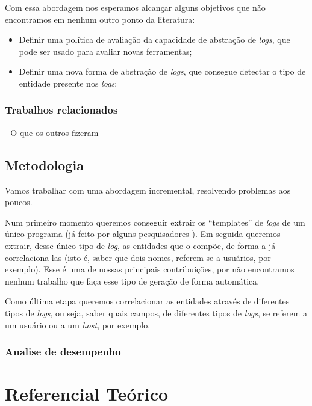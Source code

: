 \documentclass[
	12pt,				%
	openright,			%
	twoside,			%
	a4paper,			%
	english,			%
	french,				%
	spanish,			%
	brazil,				%
	]{abntex2}
\begin{document}
Com essa abordagem nos esperamos alcançar alguns objetivos que não encontramos em nenhum outro ponto da literatura:

\begin{itemize}
	\item Definir uma política de avaliação da capacidade de abstração de \emph{logs}, que pode ser usado para avaliar novas ferramentas;
	\item Definir uma nova forma de abstração de \emph{logs}, que consegue detectar o tipo de entidade presente nos \emph{logs};
\end{itemize}

\subsection{Trabalhos relacionados}
- O que os outros fizeram

\section{Metodologia}

Vamos trabalhar com uma abordagem incremental, resolvendo problemas aos poucos.

Num primeiro momento queremos conseguir extrair os ``templates'' de \emph{logs} de um único programa (já feito por alguns pesquisadores \cite{nagappan2010abstracting}). Em seguida queremos extrair, desse único tipo de \emph{log}, as entidades que o compõe, de forma a já correlaciona-las (isto é, saber que dois nomes, referem-se a usuários, por exemplo). Esse é uma de nossas principais contribuições, por não encontramos nenhum trabalho que faça esse tipo de geração de forma automática.

Como última etapa queremos correlacionar as entidades através de diferentes tipos de \emph{logs}, ou seja, saber quais campos, de diferentes tipos de \emph{logs}, se referem a um usuário ou a um \emph{host}, por exemplo.

\subsection{Analise de desempenho}

\chapter{Referencial Teórico}\label{chap:referencial}
\end{document}
